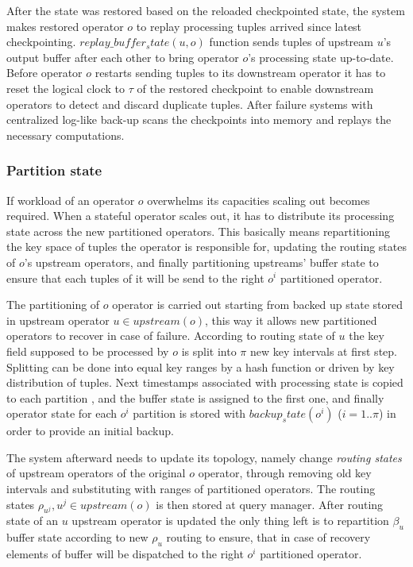  After the state was restored based on the reloaded checkpointed state, the system makes restored operator $o$ to replay processing tuples arrived since latest checkpointing. $replay\_buffer_state(u,o)$ function sends tuples of upstream $u$'s output buffer after each other to bring operator $o$'s processing state up-to-date. Before operator  $o$ restarts sending tuples to its downstream operator it has to reset the logical clock to $\tau$ of the restored checkpoint to enable downstream operators to detect and discard duplicate tuples.
After failure systems with centralized log-like back-up scans the checkpoints into memory and replays the necessary computations. 
 
\subsubsection{Partition state}
If workload of an operator $o$ overwhelms its capacities scaling out becomes required. When a stateful operator scales out, it has to distribute its processing state across the new partitioned operators. This basically means  repartitioning  the key space of tuples the operator is responsible for, updating the routing states of $o$'s upstream operators, and finally partitioning upstreams' buffer state to ensure that each tuples of it will be send to the right $o^i$ partitioned operator.

The partitioning of $o$ operator is carried out starting from backed up state stored in upstream operator $u \in upstream(o)$, this way it allows new partitioned operators to recover in case of failure. According to routing state of $u$ the key field supposed to be processed by $o$ is split into $\pi$ new key intervals at first step. Splitting can be done into equal key ranges by a hash function or driven by key distribution of tuples. Next timestamps associated with processing state is copied to each partition , and the buffer state is assigned to the first one, and finally operator state for each $o^i $ partition is stored with $backup_state(o^i)$ ($i = 1..\pi$) in order to provide an initial backup.  

The system afterward needs to update its topology, namely change  \textit{routing states} of upstream operators of the original $o$ operator, through removing old key intervals and substituting with ranges of partitioned operators. The routing states $\rho_{u^j}, u^j \in upstream(o) $ is then stored at query manager. After routing state of an $u$ upstream operator is updated the only thing left is to repartition $\beta_u$ buffer state according to new $\rho_u$ routing to ensure, that in case of recovery elements of buffer will be dispatched to the right $o^i$ partitioned operator.
  





